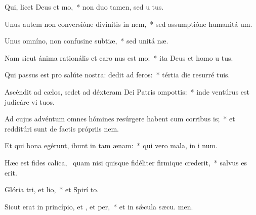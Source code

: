 \item Qui, licet Deus  et mo,~* non duo tamen, sed u  tus.
\item Unus autem non conversióne divinitis in nem,~* sed assumptióne humanitá  um.
\item Unus omníno, non confusine subtiæ,~* sed unitá næ.
\item Nam sicut ánima rationális et caro nus est mo:~* ita Deus et homo u  tus.
\item Qui passus est pro salúte nostra: dedit ad feros:~* tértia die resurré  tuis.
\item Ascéndit ad cælos, sedet ad déxteram Dei Patris ompottis:~* inde ventúrus est judicáre vi  tuos.
\item Ad cujus advéntum omnes hómines resúrgere habent cum corribus is;~* et redditúri sunt de factis própriis nem.
\item Et qui bona egérunt, ibunt in tam ænam:~* qui vero mala, in i num.
\item Hæc est fides calica,~\pscross{} quam nisi quisque fidéliter firmique crederit,~* salvus es  erit.
\item Glória tri, et lio,~* et Spirí to.
\item Sicut erat in princípio, et , et per,~* et in sǽcula sæcu. men.

